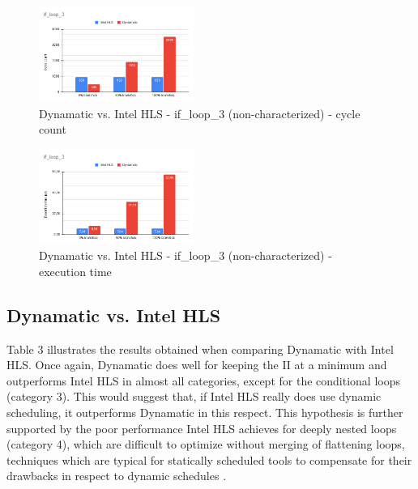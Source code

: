 \documentclass[final,5p,times,twocolumn]{elsarticle}
\begin{document}
\begin{spacing}{1.125}
\begin{figure}
	\centering 
	\includegraphics[width=0.45\textwidth]{intel_if_loop_cycles.png}	
	\caption{Dynamatic vs. Intel HLS - if\_loop\_3 (non-characterized) - cycle count} 
	\label{fig_mom0}%
\end{figure}

\begin{figure}
	\centering 
	\includegraphics[width=0.45\textwidth]{intel_if_loop_runtime.png}	
	\caption{Dynamatic vs. Intel HLS - if\_loop\_3 (non-characterized) - execution time} 
	\label{fig_mom0}%
\end{figure}



\subsection{Dynamatic vs. Intel HLS}

Table 3 illustrates the results obtained when comparing Dynamatic with Intel HLS. Once again, Dynamatic does well for keeping the II at a minimum and outperforms Intel HLS in almost all categories, except for the conditional loops (category 3). This would suggest that, if Intel HLS really does use dynamic scheduling, it outperforms Dynamatic in this respect. This hypothesis is further supported by the poor performance Intel HLS achieves for deeply nested loops (category 4), which are difficult to optimize without merging of flattening loops, techniques which are typical for statically scheduled tools to compensate for their drawbacks in respect to dynamic schedules \cite{viv_dyn_bench}.


\end{spacing}
\end{document}
